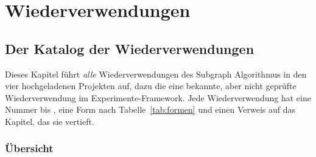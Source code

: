 
\part{Wiederverwendungen}

\chapter{Der Katalog der Wiederverwendungen}
\label{chap:katalog}

Dieses Kapitel führt \emph{alle} Wiederverwendungen des Subgraph Algorithmus in den vier hochgeladenen Projekten auf, dazu die eine bekannte, aber nicht geprüfte Wiederverwendung im Experimente-Framework. Jede Wiederverwendung hat eine Nummer  bis , eine Form nach Tabelle~\ref{tab:formen} und einen Verweis auf das Kapitel, das sie vertieft.

\section{Übersicht}

